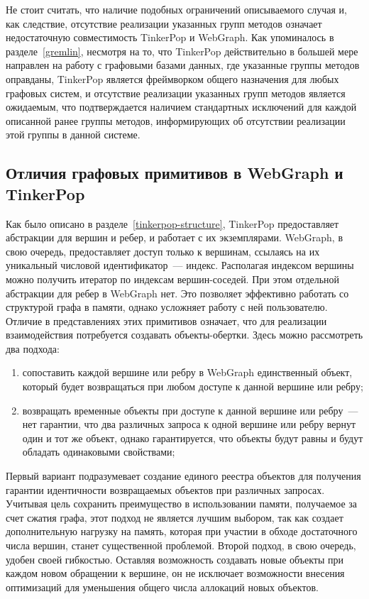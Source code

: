 \documentclass[times,specification,annotation]{itmo-student-thesis}
\begin{document}
Не стоит считать, что наличие подобных ограничений описываемого случая и, как следствие, отсутствие реализации указанных групп методов означает недостаточную совместимость TinkerPop и WebGraph. Как упоминалось в разделе~\ref{gremlin}, несмотря на то, что TinkerPop действительно в большей мере направлен на работу с графовыми базами данных, где указанные группы методов оправданы, TinkerPop является фреймворком общего назначения для любых графовых систем, и отсутствие реализации указанных групп методов является ожидаемым, что подтверждается наличием стандартных исключений для каждой описанной ранее группы методов, информирующих об отсутствии реализации этой группы в данной системе.

\subsection{Отличия графовых примитивов в WebGraph и TinkerPop}

Как было описано в разделе~\ref{tinkerpop-structure}, TinkerPop предоставляет абстракции для вершин и ребер, и работает с их экземплярами. WebGraph, в свою очередь, предоставляет доступ только к вершинам, ссылаясь на их уникальный числовой идентификатор~--- индекс. Располагая индексом вершины можно получить итератор по индексам вершин-соседей. При этом отдельной абстракции для ребер в WebGraph нет. Это позволяет эффективно работать со структурой графа в памяти, однако усложняет работу с ней пользователю. Отличие в представлениях этих примитивов означает, что для реализации взаимодействия потребуется создавать объекты-обертки. Здесь можно рассмотреть два подхода:
\begin{enumerate}
    \item сопоставить каждой вершине или ребру в WebGraph единственный объект, который будет возвращаться при любом доступе к данной вершине или ребру;
    \item возвращать временные объекты при доступе к данной вершине или ребру~--- нет гарантии, что два различных запроса к одной вершине или ребру вернут один и тот же объект, однако гарантируется, что объекты будут равны и будут обладать одинаковыми свойствами;
\end{enumerate}

Первый вариант подразумевает создание единого реестра объектов для получения гарантии идентичности возвращаемых объектов при различных запросах. Учитывая цель сохранить преимущество в использовании памяти, получаемое за счет сжатия графа, этот подход не является лучшим выбором, так как создает дополнительную нагрузку на память, которая при участии в обходе достаточного числа вершин, станет существенной проблемой.
Второй подход, в свою очередь, удобен своей гибкостью. Оставляя возможность создавать новые объекты при каждом новом обращении к вершине, он не исключает возможности внесения оптимизаций для уменьшения общего числа аллокаций новых объектов.
\end{document}
